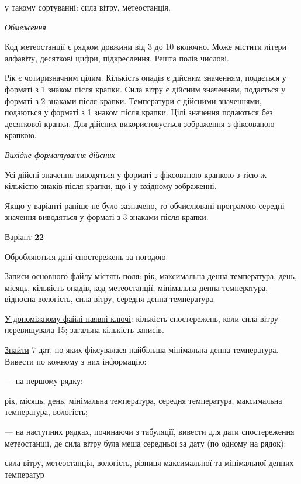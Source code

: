 \documentclass[11pt, ukrainian]{article}
\begin{document}
{\noindent}у такому сортуванні: сила вітру, метеостанція.


\bigskip\textit{Обмеження}

Код метеостанції є рядком довжини від 3 до 10 включно.
Може містити літери алфавіту, десяткові цифри, підкреслення. Решта полів числові.

Рік є чотиризначним цілим.
Кількість опадів є дійсним значенням, подається у форматі з 1 знаком після крапки.
Сила вітру є дійсним значенням, подається у форматі з 2 знаками після крапки.
Температури є дійсними значеннями, подаються у форматі з 1 знаком після крапки.
Цілі значення подаються без десяткової крапки.
Для дійсних використовується зображення з фіксованою крапкою.

\textit{Вихідне форматування дійсних}

Усі дійсні значення виводяться у форматі з фіксованою крапкою з тією ж кількістю знаків після крапки, що і у вхідному зображенні.

Якщо у варіанті раніше не було зазначено, то \underline{обчислювані програмою} середні значення виводяться у форматі з 3 знаками після крапки.


\par
\newpage
{\center Варіант  \No \textbf { 22 }\par}
\bigskip
Обробляються дані спостережень за погодою. 

\underline{Записи основного файлу містять поля}: рік, максимальна денна температура, день, місяць, кількість опадів, код метеостанції, мінімальна денна температура, відносна вологість, сила вітру, середня денна температура.

\underline{У допоміжному файлі наявні ключі}: кількість спостережень, коли сила вітру перевищувала 15; загальна кількість записів.

\underline{Знайти} 7 дат, по яких фіксувалася найбільша мінімальна денна температура. Вивести по кожному з них інформацію:\par
{\noindent}--- на першому рядку:\par
рік, місяць, день, мінімальна температура, середня температура, максимальна температура, вологість;

{\noindent}--- на наступних рядках, починаючи з табуляції, вивести для дати спостереження метеостанції, де сила вітру була меша середньої за дату (по одному на рядок):\par
сила вітру, метеостанція, вологість, різниця максимальної та мінімальної денних температур
\end{document}
